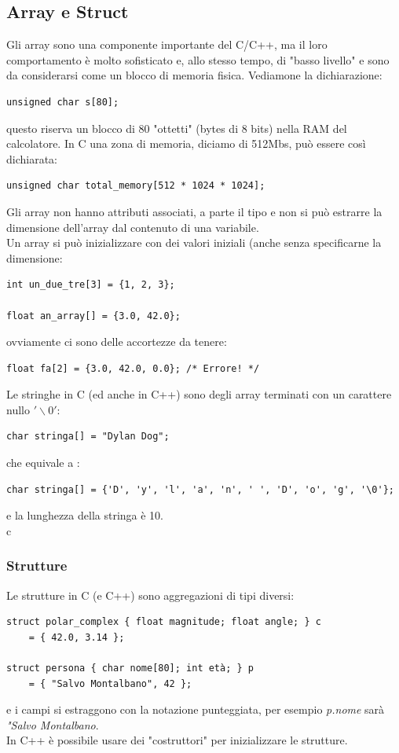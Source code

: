 \documentclass[a4paper,12pt, oneside]{book}
\begin{document}
\subsection{Array e Struct}
Gli array sono una componente importante del C/C++, ma il loro comportamento è molto sofisticato e, allo stesso tempo, di "basso livello" e sono da considerarsi come un blocco di memoria fisica. Vediamone la dichiarazione:
\begin{verbatim}
unsigned char s[80];
\end{verbatim}
questo riserva un blocco di 80 "ottetti" (bytes di 8 bits) nella RAM del calcolatore. In C una zona di memoria, diciamo di 512Mbs, può essere così dichiarata:
\begin{verbatim}
unsigned char total_memory[512 * 1024 * 1024];
\end{verbatim}
Gli array non hanno attributi associati, a parte il tipo e non si può estrarre la dimensione dell'array dal contenuto di una variabile.\\
Un array si può inizializzare con dei valori iniziali (anche senza specificarne la dimensione:
\begin{verbatim}
int un_due_tre[3] = {1, 2, 3};

float an_array[] = {3.0, 42.0};
\end{verbatim}
ovviamente ci sono delle accortezze da tenere:
\begin{verbatim}
float fa[2] = {3.0, 42.0, 0.0}; /* Errore! */
\end{verbatim}
Le stringhe in C (ed anche in C++) sono degli array terminati
con un carattere nullo $'\backslash 0'$:
\begin{verbatim}
char stringa[] = "Dylan Dog";
\end{verbatim}
che equivale a :
\begin{verbatim}
char stringa[] = {'D', 'y', 'l', 'a', 'n', ' ', 'D', 'o', 'g', '\0'};
\end{verbatim}
e la lunghezza della stringa è 10.\\c
\subsubsection{Strutture}
Le strutture in C (e C++) sono aggregazioni di tipi diversi:
\begin{verbatim}
struct polar_complex { float magnitude; float angle; } c
    = { 42.0, 3.14 };

struct persona { char nome[80]; int età; } p
    = { "Salvo Montalbano", 42 };
\end{verbatim}
e i campi si estraggono con la notazione punteggiata, per esempio \textit{p.nome} sarà \textit{"Salvo Montalbano}.\\
In C++ è possibile usare dei "costruttori" per inizializzare le strutture.
\end{document}
